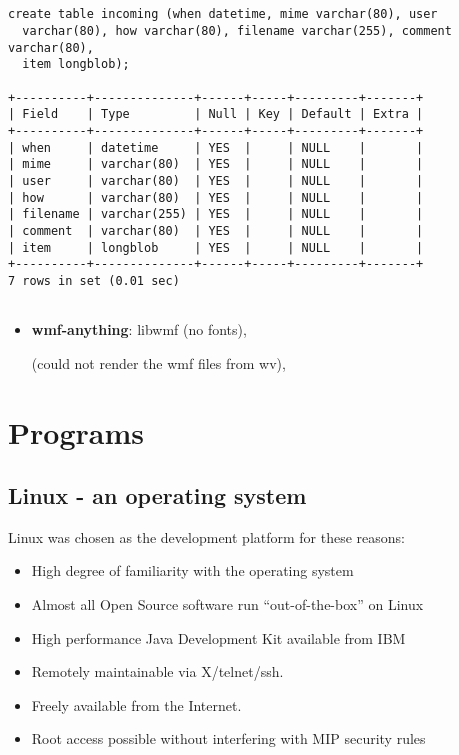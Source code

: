\begin{verbatim}


create table incoming (when datetime, mime varchar(80), user
  varchar(80), how varchar(80), filename varchar(255), comment varchar(80),
  item longblob);

+----------+--------------+------+-----+---------+-------+
| Field    | Type         | Null | Key | Default | Extra |
+----------+--------------+------+-----+---------+-------+
| when     | datetime     | YES  |     | NULL    |       |
| mime     | varchar(80)  | YES  |     | NULL    |       |
| user     | varchar(80)  | YES  |     | NULL    |       |
| how      | varchar(80)  | YES  |     | NULL    |       |
| filename | varchar(255) | YES  |     | NULL    |       |
| comment  | varchar(80)  | YES  |     | NULL    |       |
| item     | longblob     | YES  |     | NULL    |       |
+----------+--------------+------+-----+---------+-------+
7 rows in set (0.01 sec)


\end{verbatim}

\begin{itemize}
\item \textbf{ wmf-anything}: libwmf (no fonts),
  

  (could not render the wmf files from wv),
  
  

  
\end{itemize}


\section{Programs}


\subsection{Linux - an operating system}
\label{sec:linux}

Linux was chosen as the development platform for these
reasons:

\begin{itemize}
\item High degree of familiarity with the operating system
\item Almost all Open Source software run ``out-of-the-box''
  on Linux
\item High performance Java Development Kit available from
  IBM
\item Remotely maintainable via X/telnet/ssh.
\item Freely available from the Internet.
\item Root access possible without interfering with MIP
  security rules
\end{itemize}

